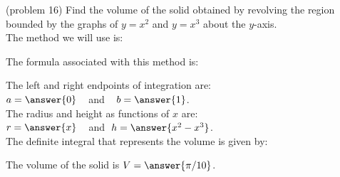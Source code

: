 \documentclass{ximera}
\begin{document}
\begin{problem}(problem 16)
Find the volume of the solid obtained by revolving the region bounded by the graphs of $y = x^2$ and $y = x^3$ about the $y$-axis.\\
The method we will use is:
\begin{multipleChoice}
\end{multipleChoice}

The formula associated with this method is:
\begin{multipleChoice}
\end{multipleChoice}

The left and right endpoints of integration are:\\
$a = \answer{0}\;\;\;$ and $\;\;\; b = \answer{1}$.\\
The radius and height as functions of $x$ are:\\
$r = \answer{x} \;\;\;$ and $\; h = \answer{x^2 -x^3}$.\\

The definite integral that represents the volume is given by:\\
\begin{multipleChoice}
\end{multipleChoice}

The volume of the solid is $V = \answer{\pi/10}$.

\end{problem}
\end{document}
